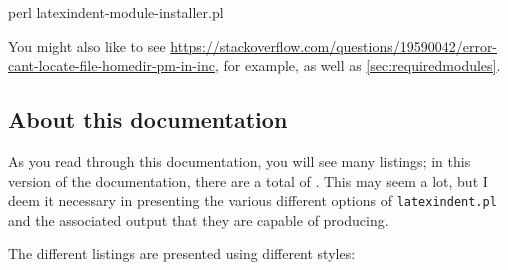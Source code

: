  \begin{commandshell}
perl latexindent-module-installer.pl
\end{commandshell}

 You might also like to see
 \href{https://stackoverflow.com/questions/19590042/error-cant-locate-file-homedir-pm-in-inc}{https://stackoverflow.com/questions/19590042/error-cant-locate-file-homedir-pm-in-inc},
 for example, as well as \vref{sec:requiredmodules}.

\subsection{About this documentation}
 As you read through this documentation, you will see many listings; in this version of
 the documentation, there are a total of \totallstlistings. This may seem a lot, but I
 deem it necessary in presenting the various different options of \texttt{latexindent.pl}
 and the associated output that they are capable of producing.

 The different listings are presented using different styles:

